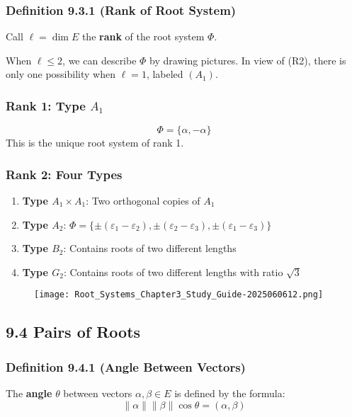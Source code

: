 \subsubsection{Definition 9.3.1 (Rank of Root System)}

Call $\ell = \dim E$ the \textbf{rank} of the root system $\Phi$.

When $\ell \leq 2$, we can describe $\Phi$ by drawing pictures. In view of (R2), there is only one possibility when $\ell = 1$, labeled $(A_1)$.

\subsubsection{Rank 1: Type \texorpdfstring{$A_1$}{A_1}}
\[
\Phi = \{\alpha, -\alpha\}
\]
This is the unique root system of rank 1.

\subsubsection{Rank 2: Four Types}

\begin{enumerate}
	\item \textbf{Type $A_1 \times A_1$}: Two orthogonal copies of $A_1$
	\item \textbf{Type $A_2$}: $\Phi = \{\pm(\varepsilon_1 - \varepsilon_2), \pm(\varepsilon_2 - \varepsilon_3), \pm(\varepsilon_1 - \varepsilon_3)\}$
	\item \textbf{Type $B_2$}: Contains roots of two different lengths
	\item \textbf{Type $G_2$}: Contains roots of two different lengths with ratio $\sqrt{3}$
\end{enumerate}

\begin{figure}[H]
\centering
\texttt{[image: Root\_Systems\_Chapter3\_Study\_Guide-2025060612.png]}
\label{}
\end{figure}

\subsection{9.4 Pairs of Roots}

\subsubsection{Definition 9.4.1 (Angle Between Vectors)}

The \textbf{angle} $\theta$ between vectors $\alpha, \beta \in E$ is defined by the formula:
\[
\|\alpha\|\|\beta\| \cos \theta = (\alpha, \beta)
\]

